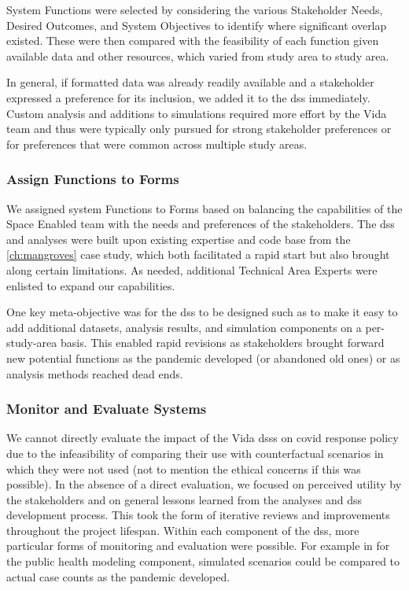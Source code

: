 System Functions were selected by considering the various Stakeholder Needs, Desired Outcomes, and System Objectives to identify where significant overlap existed. These were then compared with the feasibility of each function given available data and other resources, which varied from study area to study area.

In general, if formatted data was already readily available and a stakeholder expressed a preference for its inclusion, we added it to the \ac{dss} immediately. Custom analysis and additions to simulations required more effort by the Vida team and thus were typically only pursued for strong stakeholder preferences or for preferences that were common across multiple study areas.

\subsubsection{Assign Functions to Forms}

We assigned system Functions to Forms based on balancing the capabilities of the Space Enabled team with the needs and preferences of the stakeholders. The \ac{dss} and analyses were built upon existing expertise and code base from the \ref{ch:mangroves} case study, which both facilitated a rapid start but also brought along certain limitations. As needed, additional Technical Area Experts were enlisted to expand our capabilities. 

One key meta-objective was for the \ac{dss} to be designed such as to make it easy to add additional datasets, analysis results, and simulation components on a per-study-area basis. This enabled rapid revisions as stakeholders brought forward new potential functions as the pandemic developed (or abandoned old ones) or as analysis methods reached dead ends.

\subsubsection{Monitor and Evaluate Systems}

We cannot directly evaluate the impact of the Vida \acp{dss} on \ac{covid} response policy due to the infeasibility of comparing their use with counterfactual scenarios in which they were not used (not to mention the ethical concerns if this was possible). In the absence of a direct evaluation, we focused on perceived utility by the stakeholders and on general lessons learned from the analyses and \ac{dss} development process. This took the form of iterative reviews and improvements throughout the project lifespan. Within each component of the \ac{dss}, more particular forms of monitoring and evaluation were possible. For example in for the public health modeling component, simulated scenarios could be compared to actual case counts as the pandemic developed.

